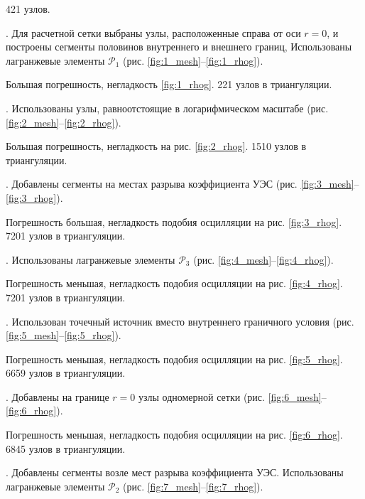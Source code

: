 421 узлов.


 \theexp.
Для расчетной сетки выбраны узлы, расположенные справа от оси ${r = 0}$,
и построены сегменты половинов внутреннего и внешнего границ,
Использованы лагранжевые элементы ${\mathcal{P}_1}$ (рис. \ref{fig:1_mesh}--\ref{fig:1_rhog}).

Большая погрешность, негладкость \ref{fig:1_rhog}. 221 узлов в триангуляции.


 \theexp.
Использованы узлы, равноотстоящие в логарифмическом масштабе (рис. \ref{fig:2_mesh}--\ref{fig:2_rhog}).

Большая погрешность, негладкость на рис. \ref{fig:2_rhog}. 1510 узлов в триангуляции.


 \theexp.
Добавлены сегменты на местах разрыва коэффициента УЭС (рис. \ref{fig:3_mesh}--\ref{fig:3_rhog}).

Погрешность большая, негладкость подобия осцилляции на рис. \ref{fig:3_rhog}. 7201 узлов в триангуляции.


 \theexp.
Использованы лагранжевые элементы ${\mathcal{P}_3}$ (рис. \ref{fig:4_mesh}--\ref{fig:4_rhog}).

Погрешность меньшая, негладкость подобия осцилляции на рис. \ref{fig:4_rhog}. 7201 узлов в триангуляции.


 \theexp \label{optimal}.
Использован точечный источник вместо внутреннего граничного условия  (рис. \ref{fig:5_mesh}--\ref{fig:5_rhog}).

Погрешность меньшая, негладкость подобия осцилляции на рис. \ref{fig:5_rhog}. 6659 узлов в триангуляции.


 \theexp.
Добавлены на границе ${r = 0}$ узлы одномерной сетки (рис. \ref{fig:6_mesh}--\ref{fig:6_rhog}).

Погрешность меньшая, негладкость подобия осцилляции на рис. \ref{fig:6_rhog}. 6845 узлов в триангуляции.


 \theexp.
Добавлены сегменты возле мест разрыва коэффициента УЭС. Использованы лагранжевые элементы ${\mathcal{P}_2}$
(рис. \ref{fig:7_mesh}--\ref{fig:7_rhog}).

